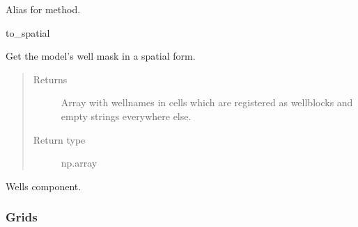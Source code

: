 \documentclass[letterpaper,10pt,english]{sphinxmanual}
\begin{document}
\begin{fulllineitems}
\begin{fulllineitems}
\label{\detokenize{api/field:geology.src.Field.unravel}}
Alias for  method.

to\_spatial

\end{fulllineitems}


\begin{fulllineitems}
\label{\detokenize{api/field:geology.src.Field.well_mask}}
Get the model’s well mask in a spatial form.
\begin{quote}\begin{description}
\item[{Returns}] \leavevmode
{} \textendash{} Array with well\sphinxhyphen{}names in cells which are registered as well\sphinxhyphen{}blocks and empty strings everywhere else.

\item[{Return type}] \leavevmode
np.array

\end{description}\end{quote}

\end{fulllineitems}


\begin{fulllineitems}
\label{\detokenize{api/field:geology.src.Field.wells}}
Wells component.

\end{fulllineitems}


\end{fulllineitems}



\subsubsection{Grids}
\label{\detokenize{api/grids:grids}}\label{\detokenize{api/grids::doc}}
\end{document}
